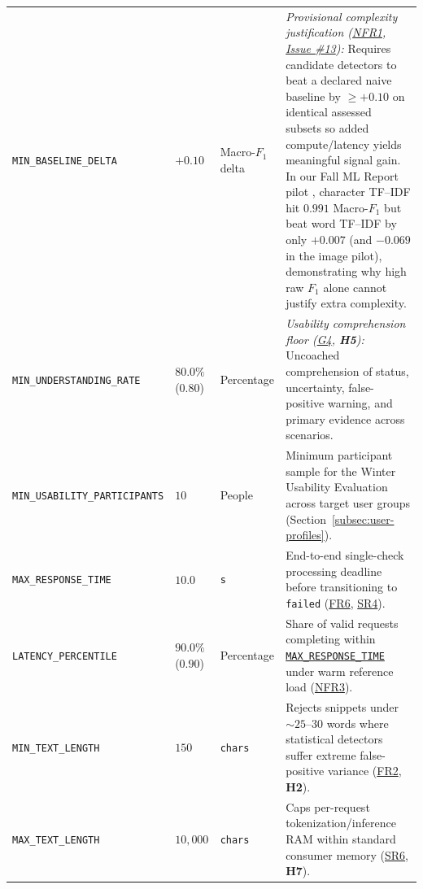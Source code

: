 \documentclass[11pt]{article}
\newcommand{\MaxResponseTime}{\hyperref[const:MAX_RESPONSE_TIME]{\texttt{MAX\_\allowbreak{}RESPONSE\_\allowbreak{}TIME}}}
\begin{document}
{\begin{tabularx}{\textwidth}{P{4.4cm} P{1.7cm} P{1.8cm} Y}
\addlinespace
{}\label{const:MIN_BASELINE_DELTA}\texttt{MIN\_\allowbreak{}BASELINE\_\allowbreak{}DELTA} & $+0.10$ & Macro-$F_1$ delta & \emph{Provisional complexity justification (\hyperref[NFR1]{NFR1}, \href{https://github.com/richy1337/Verity/issues/13}{Issue \#13}):} Requires candidate detectors to beat a declared naive baseline by $\ge +0.10$ on identical assessed subsets so added compute/latency yields meaningful signal gain. In our Fall ML Report pilot \cite{VerityMLReport2026}, character TF--IDF hit $0.991$ Macro-$F_1$ but beat word TF--IDF by only $+0.007$ (and $-0.069$ in the image pilot), demonstrating why high raw $F_1$ alone cannot justify extra complexity.\\
\addlinespace
{}\label{const:MIN_UNDERSTANDING_RATE}\texttt{MIN\_\allowbreak{}UNDERSTANDING\_\allowbreak{}RATE} & $80.0\%$ ($0.80$) & Percentage & \emph{Usability comprehension floor (\hyperref[G4]{G4}, \textbf{H5}):} Uncoached comprehension of status, uncertainty, false-positive warning, and primary evidence across scenarios.\\
\addlinespace
{}\label{const:MIN_USABILITY_PARTICIPANTS}\texttt{MIN\_\allowbreak{}USABILITY\_\allowbreak{}PARTICIPANTS} & $10$ & People & Minimum participant sample for the Winter Usability Evaluation across target user groups (Section~\ref{subsec:user-profiles}).\\
\addlinespace
{}\label{const:MAX_RESPONSE_TIME}\texttt{MAX\_\allowbreak{}RESPONSE\_\allowbreak{}TIME} & $10.0$ & \texttt{s} & End-to-end single-check processing deadline before transitioning to \texttt{failed} (\hyperref[FR6]{FR6}, \hyperref[SR4]{SR4}).\\
\addlinespace
{}\label{const:LATENCY_PERCENTILE}\texttt{LATENCY\_\allowbreak{}PERCENTILE} & $90.0\%$ ($0.90$) & Percentage & Share of valid requests completing within \MaxResponseTime{} under warm reference load (\hyperref[NFR3]{NFR3}).\\
\addlinespace
{}\label{const:MIN_TEXT_LENGTH}\texttt{MIN\_\allowbreak{}TEXT\_\allowbreak{}LENGTH} & $150$ & \texttt{chars} & Rejects snippets under $\sim 25$--$30$ words where statistical detectors suffer extreme false-positive variance (\hyperref[FR2]{FR2}, \textbf{H2}).\\
\addlinespace
{}\label{const:MAX_TEXT_LENGTH}\texttt{MAX\_\allowbreak{}TEXT\_\allowbreak{}LENGTH} & $10{,}000$ & \texttt{chars} & Caps per-request tokenization/inference RAM within standard consumer memory (\hyperref[SR6]{SR6}, \textbf{H7}).\\

\end{tabularx}}
\end{document}
